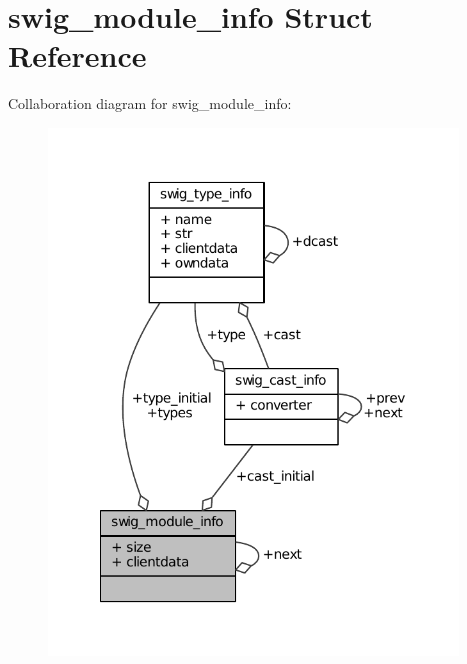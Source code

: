 \hypertarget{structswig__module__info}{\section{swig\-\_\-module\-\_\-info Struct Reference}
\label{structswig__module__info}
}


Collaboration diagram for swig\-\_\-module\-\_\-info\-:
\nopagebreak
\begin{figure}[H]
\begin{center}
\leavevmode
\includegraphics[width=308pt]{structswig__module__info__coll__graph}
\end{center}
\end{figure}
